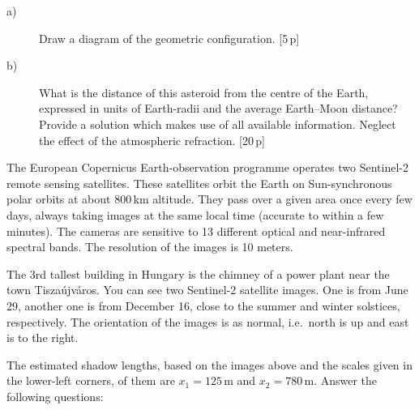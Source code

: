 \begin{description}
\item[a)] Draw a diagram of the geometric configuration. \hfill[5\,p]
\item[b)] What is the distance of this asteroid from the centre of the Earth,
  expressed in units of Earth-radii and the average Earth--Moon distance?
  Provide a solution which makes use of all available information. Neglect the
  effect of the atmospheric refraction. \hfill[20\,p]
\end{description}

The European Copernicus Earth-observation programme operates two Sentinel-2
remote sensing satellites. These satellites orbit the Earth on Sun-synchronous
polar orbits at about 800\,km altitude. They pass over a given area once every
few days, always taking images at the same local time (accurate to within a few
minutes). The cameras are sensitive to 13 different optical and near-infrared
spectral bands. The resolution of the images is 10 meters.

The 3rd tallest building in Hungary is the chimney of a power plant near the
town Tisza\'ujv\'aros. You can see two Sentinel-2 satellite images. One is from
June 29, another one is from December 16, close to the summer and winter
solstices, respectively. The orientation of the images is as normal, i.e.\
north is up and east is to the right.


The estimated shadow lengths, based on the images above and the scales given in
the lower-left corners, of them are $x_1 = 125$\,m and $x_2 = 780$\,m. Answer
the following questions:

